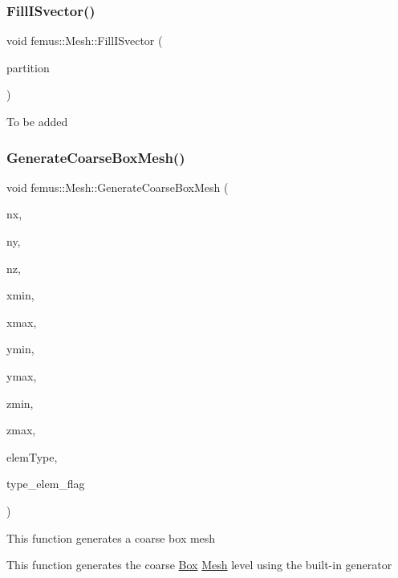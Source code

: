 \subsubsection{\texorpdfstring{Fill\+I\+Svector()}{FillISvector()}}
{\footnotesize\ttfamily void femus\+::\+Mesh\+::\+Fill\+I\+Svector (\begin{DoxyParamCaption}\item[{vector$<$ unsigned $>$ \&}]{partition }\end{DoxyParamCaption})}

To be added \mbox{\label{classfemus_1_1_mesh_a0ac9ef39a592ef9cfddb8bb4aae995b1}} 
\subsubsection{\texorpdfstring{Generate\+Coarse\+Box\+Mesh()}{GenerateCoarseBoxMesh()}}
{\footnotesize\ttfamily void femus\+::\+Mesh\+::\+Generate\+Coarse\+Box\+Mesh (\begin{DoxyParamCaption}\item[{const unsigned int}]{nx,  }\item[{const unsigned int}]{ny,  }\item[{const unsigned int}]{nz,  }\item[{const double}]{xmin,  }\item[{const double}]{xmax,  }\item[{const double}]{ymin,  }\item[{const double}]{ymax,  }\item[{const double}]{zmin,  }\item[{const double}]{zmax,  }\item[{const \mbox{\hyperlink{_elem_type_enum_8hpp_a1b014294b9757a001707c979e2bab627}{Elem\+Type}}}]{elem\+Type,  }\item[{std\+::vector$<$ bool $>$ \&}]{type\+\_\+elem\+\_\+flag }\end{DoxyParamCaption})}

This function generates a coarse box mesh

This function generates the coarse \mbox{\hyperlink{classfemus_1_1_box}{Box}} \mbox{\hyperlink{classfemus_1_1_mesh}{Mesh}} level using the built-\/in generator \mbox{\label{classfemus_1_1_mesh_a1038eadb501b8478a0da681e7040a10a}} 
